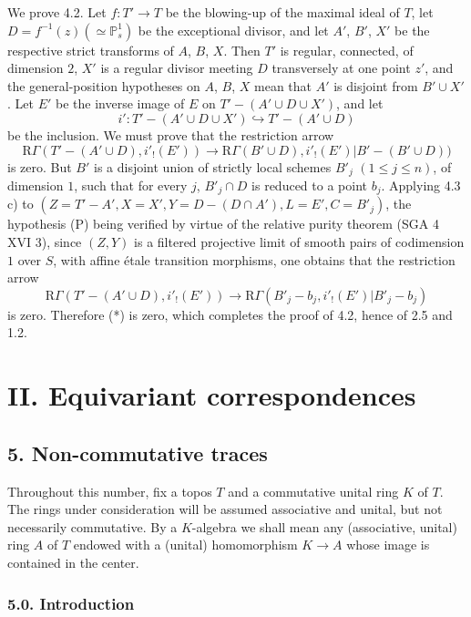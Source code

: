 \documentclass[11pt]{article}
\begin{document}
We prove 4.2. Let $f:T'\to T$ be the blowing-up of the maximal ideal of $T$, let $D=f^{-1}(z)(\simeq\mathbb P^1_s)$ be the exceptional divisor, and let $A'$, $B'$, $X'$ be the respective strict transforms of $A$, $B$, $X$. Then $T'$ is regular, connected, of dimension $2$, $X'$ is a regular divisor meeting $D$ transversely at one point $z'$, and the general-position hypotheses on $A$, $B$, $X$ mean that $A'$ is disjoint from $B'\cup X'$. Let $E'$ be the inverse image of $E$ on $T'-(A'\cup D\cup X')$, and let
\[
i':T'-(A'\cup D\cup X')\hookrightarrow T'-(A'\cup D)
\]
be the inclusion. We must prove that the restriction arrow
\begin{equation}
\mathrm R\Gamma(T'-(A'\cup D),i'_!(E'))
\longrightarrow
\mathrm R\Gamma(B'\cup D),i'_!(E')|B'-(B'\cup D))
\tag{*}
\end{equation}
is zero. But $B'$ is a disjoint union of strictly local schemes $B'_j$ $(1\le j\le n)$, of dimension $1$, such that for every $j$, $B'_j\cap D$ is reduced to a point $b_j$. Applying 4.3 c) to $(Z=T'-A', X=X', Y=D-(D\cap A'), L=E', C=B'_j)$, the hypothesis (P) being verified by virtue of the relative purity theorem (SGA 4 XVI 3), since $(Z,Y)$ is a filtered projective limit of smooth pairs of codimension $1$ over $S$, with affine étale transition morphisms, one obtains that the restriction arrow
\[
\mathrm R\Gamma(T'-(A'\cup D),i'_!(E'))
\longrightarrow
\mathrm R\Gamma(B'_j-b_j,i'_!(E')|B'_j-b_j)
\]
is zero. Therefore (*) is zero, which completes the proof of 4.2, hence of 2.5 and 1.2.

\section*{II. Equivariant correspondences}

\subsection*{5. Non-commutative traces}

Throughout this number, fix a topos $T$ and a commutative unital ring $K$ of $T$. The rings under consideration will be assumed associative and unital, but not necessarily commutative. By a $K$-algebra we shall mean any (associative, unital) ring $A$ of $T$ endowed with a (unital) homomorphism $K\to A$ whose image is contained in the center.

\subsubsection*{5.0. Introduction}
\end{document}
